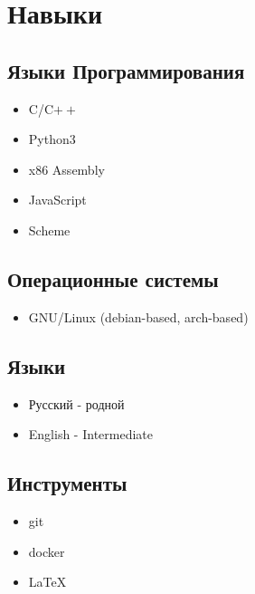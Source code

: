 \documentclass{article}
\begin{document}
    \section{Навыки}
        \begin{multicols}{2}
            \subsection{Языки Программирования}
                \begin{itemize}
                    \item C/C$\boldsymbol{++}$
                    \item Python3
                    \item x86 Assembly
                    \item JavaScript
                    \item Scheme
                \end{itemize}

            \subsection{Операционные системы}
               \begin{itemize}
                    \item GNU/Linux (debian-based, arch-based)
               \end{itemize}
            \subsection{Языки}
                \begin{itemize}
                    \item Русский - родной
                    \item English - Intermediate
                \end{itemize}
            \subsection{Инструменты}
                \begin{itemize}
                    \item git
                    \item docker
                    \item \LaTeX
                \end{itemize}
        \end{multicols}
\end{document}
